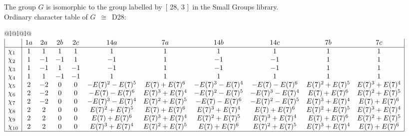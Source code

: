 \documentclass[varwidth=\maxdimen,border=10]{standalone}
\begin{document}
The group $G$ is isomorphic to the group labelled by\ [ 28, 3 ]\ in the Small Groups library.\\
Ordinary character table of $G$\ $\cong$\ D28:\\
\begin{center}
\begin{tabular}{@{}l@{}l@{}l@{}}
\hline
\(\begin{array}{|l|cccccccccc|}
  & 1a & 2a & 2b & 2c & 14a & 7a & 14b & 14c & 7b & 7c\\ \hline
\chi_{1} & 1 & 1 & 1 & 1 & 1 & 1 & 1 & 1 & 1 & 1\\
\chi_{2} & 1 & -1 & -1 & 1 & -1 & 1 & -1 & -1 & 1 & 1\\
\chi_{3} & 1 & -1 & 1 & -1 & -1 & 1 & -1 & -1 & 1 & 1\\
\chi_{4} & 1 & 1 & -1 & -1 & 1 & 1 & 1 & 1 & 1 & 1\\
\chi_{5} & 2 & -2 & 0 & 0 & -E(7)^{2}-E(7)^{5} & E(7)+E(7)^{6} & -E(7)^{3}-E(7)^{4} & -E(7)-E(7)^{6} & E(7)^{2}+E(7)^{5} & E(7)^{3}+E(7)^{4}\\
\chi_{6} & 2 & -2 & 0 & 0 & -E(7)-E(7)^{6} & E(7)^{3}+E(7)^{4} & -E(7)^{2}-E(7)^{5} & -E(7)^{3}-E(7)^{4} & E(7)+E(7)^{6} & E(7)^{2}+E(7)^{5}\\
\chi_{7} & 2 & -2 & 0 & 0 & -E(7)^{3}-E(7)^{4} & E(7)^{2}+E(7)^{5} & -E(7)-E(7)^{6} & -E(7)^{2}-E(7)^{5} & E(7)^{3}+E(7)^{4} & E(7)+E(7)^{6}\\
\chi_{8} & 2 & 2 & 0 & 0 & E(7)^{2}+E(7)^{5} & E(7)+E(7)^{6} & E(7)^{3}+E(7)^{4} & E(7)+E(7)^{6} & E(7)^{2}+E(7)^{5} & E(7)^{3}+E(7)^{4}\\
\chi_{9} & 2 & 2 & 0 & 0 & E(7)+E(7)^{6} & E(7)^{3}+E(7)^{4} & E(7)^{2}+E(7)^{5} & E(7)^{3}+E(7)^{4} & E(7)+E(7)^{6} & E(7)^{2}+E(7)^{5}\\
\chi_{10} & 2 & 2 & 0 & 0 & E(7)^{3}+E(7)^{4} & E(7)^{2}+E(7)^{5} & E(7)+E(7)^{6} & E(7)^{2}+E(7)^{5} & E(7)^{3}+E(7)^{4} & E(7)+E(7)^{6}\\
\hline
\end{array}\)\\
\end{tabular}
\end{center}
\end{document}
